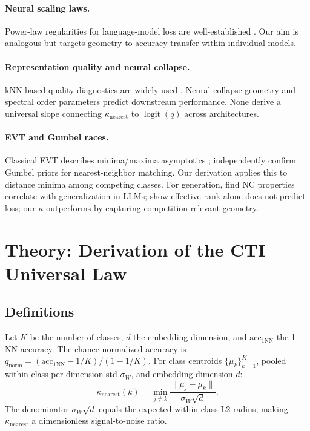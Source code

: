 \documentclass{article}
\DeclareMathOperator{\logit}{logit}
\begin{document}
\paragraph{Neural scaling laws.}
Power-law regularities for language-model loss are well-established \citep{kaplan2020,hoffmann2022}. Our aim is analogous but targets geometry-to-accuracy transfer within individual models.

\paragraph{Representation quality and neural collapse.}
kNN-based quality diagnostics are widely used \citep{wu2018,caron2021}. Neural collapse geometry \citep{papyan2020,han2022,zhu2021,rangamani2023,wu2024linguistic} and spectral order parameters \citep{garrido2023,liu2025,munn2024} predict downstream performance. None derive a universal slope connecting $\kappa_\mathrm{nearest}$ to $\logit(q)$ across architectures.

\paragraph{EVT and Gumbel races.}
Classical EVT describes minima/maxima asymptotics \citep{fisher1928,gnedenko1943,gumbel1958}; \citet{zhang2025gps} independently confirm Gumbel priors for nearest-neighbor matching. Our derivation applies this to distance minima among competing classes. For generation, \citet{wu2024linguistic} find NC properties correlate with generalization in LLMs; \citet{kulkarni2026disentangling} show effective rank alone does not predict loss; our $\kappa$ outperforms by capturing competition-relevant geometry.

\section{Theory: Derivation of the CTI Universal Law}
\subsection{Definitions}
Let $K$ be the number of classes, $d$ the embedding dimension, and $\mathrm{acc}_{1\mathrm{NN}}$ the 1-NN accuracy.
The chance-normalized accuracy is
$q_{\mathrm{norm}}=(\mathrm{acc}_{1\mathrm{NN}}-1/K)/(1-1/K)$.
For class centroids $\{\mu_k\}_{k=1}^K$, pooled within-class per-dimension std $\sigma_W$, and embedding dimension $d$:
\begin{equation}
\kappa_{\mathrm{nearest}}(k)=\min_{j\neq k}\frac{\|\mu_j-\mu_k\|}{\sigma_W\sqrt{d}}.
\end{equation}
The denominator $\sigma_W\sqrt{d}$ equals the expected within-class L2 radius, making $\kappa_{\mathrm{nearest}}$ a dimensionless signal-to-noise ratio.
\end{document}
